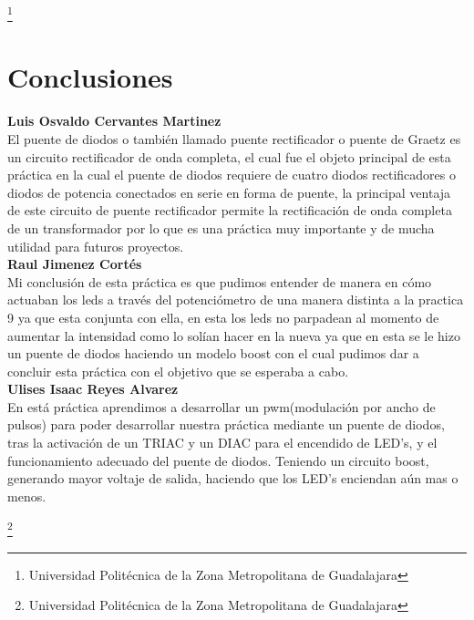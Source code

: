 \documentclass[10pt,a4paper]{article}
\begin{document}
\footnote{Universidad Politécnica de la Zona Metropolitana de Guadalajara}

\newpage
\section{Conclusiones}
\textbf{Luis Osvaldo Cervantes Martinez}\\
El puente de diodos o también llamado puente rectificador o puente de Graetz es un circuito rectificador de onda completa, el cual fue el objeto principal de esta práctica en la cual el puente de diodos requiere de cuatro diodos rectificadores o diodos de potencia conectados en serie en forma de puente, la principal ventaja de este circuito de puente rectificador permite la rectificación de onda completa de un transformador por lo que es una práctica muy importante y de mucha utilidad para futuros proyectos.\\

\textbf{Raul Jimenez Cortés}\\
Mi conclusión de esta práctica es que pudimos entender de manera en cómo actuaban los leds a través del potenciómetro de una manera distinta a la practica 9 ya que esta conjunta con ella, en esta los leds no parpadean al momento de aumentar la intensidad como lo solían hacer en la nueva ya que en esta se le hizo un puente de diodos  haciendo un modelo boost con el cual pudimos dar a concluir esta práctica con el objetivo que se esperaba a cabo.\\

\textbf{Ulises Isaac Reyes Alvarez}\\
En está práctica aprendimos a desarrollar un pwm(modulación por ancho de pulsos) para poder desarrollar nuestra práctica mediante un puente de diodos, tras la activación de un TRIAC y un DIAC para el encendido de LED's, y el funcionamiento adecuado del puente de diodos. Teniendo un circuito boost, generando mayor voltaje de salida, haciendo que los LED's enciendan aún mas o menos. 

\footnote{Universidad Politécnica de la Zona Metropolitana de Guadalajara}
\end{document}
